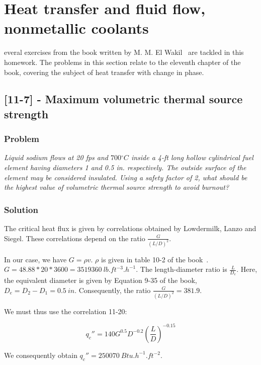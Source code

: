 %
%
\let\textcircled=\pgftextcircled
\chapter{Heat transfer and fluid flow, nonmetallic coolants}
\label{chap:intro}

everal exercises from the book written by M. M. El Wakil~\cite{book01} are tackled in this homework. The problems in this section relate to the eleventh chapter of the book, covering the subject of heat transfer with change in phase.

\section{[11-7] - Maximum volumetric thermal source strength}
\label{prob111}


\subsection{Problem}
\textit{Liquid sodium flows at 20 fps and $700{}^\circ C$ inside a 4-ft long hollow cylindrical fuel element having diameters 1 and 0.5 in. respectively. The outside surface of the element may be considered insulated. Using a safety factor of 2, what should be the highest value of volumetric thermal source strength to avoid burnout?}

\subsection{Solution}


The critical heat flux is given by correlations obtained by Lowdermilk, Lanzo and Siegel. These correlations depend on the ratio $\frac{G}{(L/D)^2}$.

In our case, we have $G = \rho v$. $\rho$ is given in table 10-2 of the book~\cite{book01}. $G = 48.88 * 20 * 3600 = 3519360\ lb.ft^{-3}.h^{-1}$. The length-diameter ratio is $\frac{L}{D_e}$. Here, the equivalent diameter is given by Equation 9-35 of the book, $D_e = D_2 - D_1 = 0.5\ in$. Consequently, the ratio $\frac{G}{(L/D)^2} = 381.9$.

We must thus use the correlation 11-20:

\begin{equation}
q_c'' = 140 G^{0.5}D^{-0.2}\left( \frac{L}{D} \right)^{-0.15}
\end{equation}

We consequently obtain $q_c'' = 250070\ Btu.h^{-1}.ft^{-2}$.

